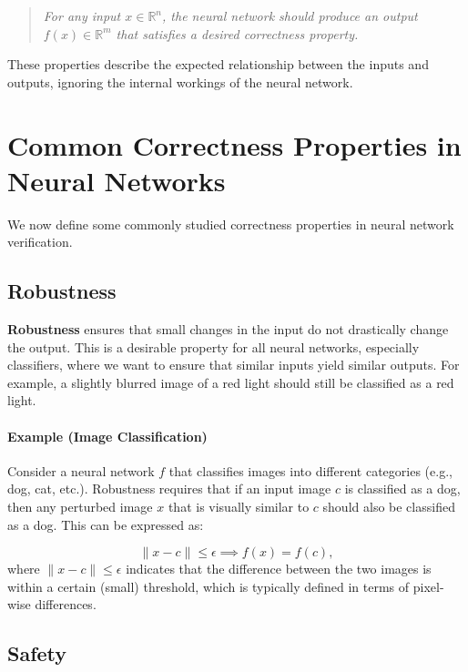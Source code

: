 \documentclass[oneside,11pt,dvipsnames]{book}
\newcommand{\mycomment}[3][\color{blue}]{{#1{{#2}: {#3}}}}
\newcommand{\tvn}[1]{\mycomment{TVN}{#1}}{}
\begin{document}
\begin{quote}
\textit{For any input $x \in \mathbb{R}^{n}$, the neural network should produce an output $f(x) \in \mathbb{R}^{m}$ that satisfies a desired correctness property.}
\end{quote}

These properties describe the expected relationship between the inputs and outputs, ignoring the internal workings of the neural network.

\section{Common Correctness Properties in Neural Networks}

We now define some commonly studied correctness properties in neural network verification.

\subsection{Robustness}

\textbf{Robustness} ensures that small changes in the input do not drastically change the output. This is a desirable property for all neural networks, especially classifiers, where we want to ensure that similar inputs yield similar outputs. For example, a slightly blurred image of a red light should still be classified as a red light.

\paragraph{Example (Image Classification)}
Consider a neural network $f$ that classifies images into different categories (e.g., dog, cat, etc.). Robustness requires that if an input image $c$ is classified as a dog, then any perturbed image $x$ that is visually similar to $c$ should also be classified as a dog. This can be expressed as:

\[
\|x - c\| \leq \epsilon \implies f(x) = f(c), 
\]
where $\|x - c\| \leq \epsilon$ indicates that the difference between the two images is within a certain (small) threshold, which is typically defined in terms of pixel-wise differences.




\subsection{Safety}
\end{document}
